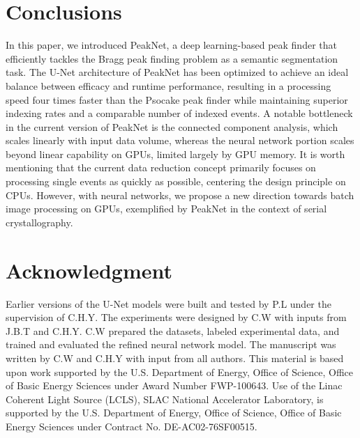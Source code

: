 \documentclass[conference]{IEEEtran}
\newcommand{\peaknet}{PeakNet}
\newcommand{\psocake}{Psocake}
\begin{document}

\section{Conclusions}

In this paper, we introduced \peaknet{}, a deep learning-based peak finder that
efficiently tackles the Bragg peak finding problem as a semantic segmentation
task. The U-Net architecture of \peaknet{} has been optimized to achieve an
ideal balance between efficacy and runtime performance, resulting in a
processing speed four times faster than the \psocake{} peak finder while
maintaining superior indexing rates and a comparable number of indexed events. A
notable bottleneck in the current version of \peaknet{} is the connected
component analysis, which scales linearly with input data volume, whereas the
neural network portion scales beyond linear capability on GPUs, limited largely
by GPU memory. It is worth mentioning that the current data reduction concept
primarily focuses on processing single events as quickly as possible, centering
the design principle on CPUs. However, with neural networks, we propose a new
direction towards batch image processing on GPUs, exemplified by \peaknet{} in
the context of serial crystallography.


\section*{Acknowledgment}

Earlier versions of the U-Net models were built and tested by P.L under the
supervision of C.H.Y.  The experiments were designed by C.W with inputs from
J.B.T and C.H.Y.  C.W prepared the datasets, labeled experimental data, and
trained and evaluated the refined neural network model.  The manuscript was
written by C.W and C.H.Y with input from all authors.  This material is based
upon work supported by the U.S.  Department of Energy, Office of Science, Office
of Basic Energy Sciences under Award Number FWP-100643.  Use of the Linac
Coherent Light Source (LCLS), SLAC National Accelerator Laboratory, is supported
by the U.S. Department of Energy, Office of Science, Office of Basic Energy
Sciences under Contract No.  DE-AC02-76SF00515.



\end{document}

